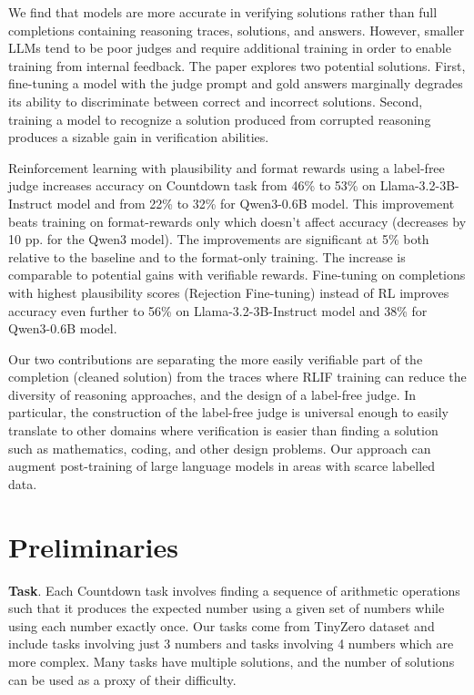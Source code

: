 \documentclass[12pt,a4paper]{article}
\begin{document}
We find that models are more accurate in verifying solutions rather than full completions containing reasoning traces, solutions, and answers. However, smaller LLMs tend to be poor judges and require additional training in order to enable training from internal feedback. The paper explores two potential solutions. First, fine-tuning a model with the judge prompt and gold answers marginally degrades its ability to discriminate between correct and incorrect solutions. Second, training a model to recognize a solution produced from corrupted reasoning produces a sizable gain in verification abilities.

Reinforcement learning with plausibility and format rewards using a label-free judge increases accuracy on Countdown task from  46\% to 53\% on  Llama-3.2-3B-Instruct model and from 22\% to 32\% for Qwen3-0.6B model. This improvement beats training on format-rewards only which doesn't affect accuracy (decreases by 10 pp. for the Qwen3 model). The improvements are significant at 5\% both relative to the baseline and to the format-only training. The increase is comparable to potential gains with verifiable rewards. Fine-tuning on completions with highest plausibility scores (Rejection Fine-tuning) instead of RL improves accuracy even further to 56\% on Llama-3.2-3B-Instruct model  and 38\% for  Qwen3-0.6B model.

Our two contributions are separating the more easily verifiable part of the completion (cleaned solution) from the traces where RLIF training can reduce the diversity of reasoning approaches, and the design of a label-free judge. In particular, the construction of the label-free judge is universal enough to easily translate to other domains where verification is easier than finding a solution such as mathematics, coding, and other design problems. Our approach can augment post-training of large language models in areas with scarce labelled data.

\vspace{10pt}
\section{Preliminaries}

\textbf{Task}. Each Countdown task involves finding a sequence of arithmetic operations such that it produces the expected number using a given set of numbers while using each number exactly once. Our tasks come from TinyZero dataset \citep{pan_tinyzero_2025} and include tasks involving just 3 numbers and tasks involving 4 numbers which are more complex. Many tasks have multiple solutions, and the number of solutions can be used as a proxy of their difficulty.
\end{document}
